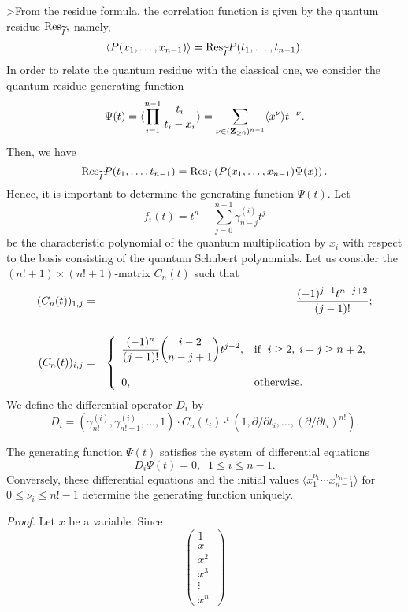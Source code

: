 {{>From the residue formula, the correlation function is 
given by the quantum residue ${\rm Res}_{\widetilde I},$ namely, 
\[ \langle P(x_1, \ldots , x_{n-1}) \rangle = {\rm Res}_{\widetilde I} 
P(t_1, \ldots ,t_{n-1}) . \] 
In order to relate the quantum residue with the 
classical one, we consider the quantum residue generating 
function 
\[ \Psi(t) = \langle \prod_{i=1}^{n-1} \frac{t_i}
{t_i - x_i} \rangle 
= \sum_{\nu \in ({\bf Z}_{\geq 0})^{n-1}}
\langle x^{\nu} \rangle t^{-\nu}.\] 
Then, we have 
\[ {\rm Res}_{\widetilde I} P(t_1,\ldots ,t_{n-1}) = 
{\rm Res}_I \left( P(x_1,\ldots ,x_{n-1}) 
\Psi(x) \right) . \] 
Hence, it is important to determine the generating function 
$\Psi(t).$ Let 
\[ f_i(t) = t^n + 
\sum_{j=0}^{n-1} \gamma_{n-j}^{(i)} t^j \] 
be the characteristic polynomial of the 
quantum multiplication by $x_i$ with respect to the basis 
consisting of the quantum Schubert polynomials. 
Let us consider the $(n!+1)\times (n!+1)$-matrix $C_n(t)$ 
such that 
\begin{eqnarray*}(C_n(t))_{1,j} &=& \frac{(-1)^{j-1} t^{n-j+2}}{(j-1)!}; \\
\\ 
(C_n(t))_{i,j} &=& \left\{  
\begin{array}{ll}
\displaystyle\frac{(-1)^n}{(j-1)!} 
{i-2 \choose n-j+1} t^{j-2}, & {\rm if} 
\; \; i\geq 2, \; i+j \geq n+2,  
 \\ \\
0, & {\rm otherwise.} 
\end{array} 
\right. 
\end{eqnarray*} 
We define the differential operator $D_i$ by 
\[ D_i = (\gamma_{n!}^{(i)},\gamma_{n!-1}^{(i)},\ldots,1)
\cdot C_n(t_i) \cdot 
 ^{t}\! (1,\partial / \partial t_i,\ldots 
,(\partial / \partial t_i )^{n!} ). \] 
\begin{pr} The generating function 
$\Psi(t)$  
satisfies the system 
of differential equations 
\[ D_i \Psi(t) = 0, 
\; \; 1\leq i \leq n-1. \] 
Conversely, these differential equations and the initial 
values $\langle x_1^{\nu_1}\cdots x_{n-1}^{\nu_{n-1}} \rangle $ 
for $0\leq \nu_i \leq n!-1$ 
determine the generating function uniquely.  
\end{pr} 
{\it Proof.} Let $x$ be a variable. Since 
\[ \left( \begin{array}{c}
1 \\ x \\ x^2 \\ x^3 \\ \vdots \\ x^{n!} 
\end{array} \right) 
\]}}
